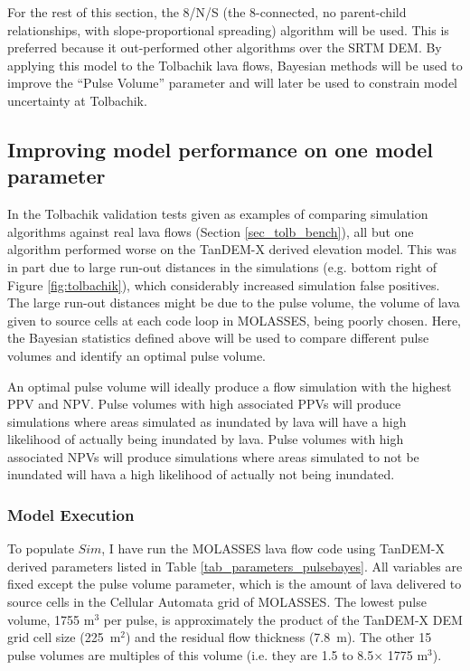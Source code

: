 	For the rest of this section, the 8/N/S (the 8-connected, no parent-child relationships, with slope-proportional spreading) algorithm will be used. This is preferred because it out-performed other algorithms over the SRTM DEM. By applying this model to the Tolbachik lava flows, Bayesian methods will be used to improve the ``Pulse Volume'' parameter and will later be used to constrain model uncertainty at Tolbachik.
	
	\subsection{Improving model performance on one model parameter}\label{sec_bayespulse}
	In the Tolbachik validation tests given as examples of comparing simulation algorithms against real lava flows (Section \ref {sec_tolb_bench}), all but one algorithm performed worse on the TanDEM-X derived elevation model. This was in part due to large run-out distances in the simulations (e.g. bottom right of Figure \ref{fig:tolbachik}), which considerably increased simulation false positives. The large run-out distances might be due to the pulse volume, the volume of lava given to source cells at each code loop in MOLASSES, being poorly chosen. Here, the Bayesian statistics defined above will be used to compare different pulse volumes and identify an optimal pulse volume. 
		
		An optimal pulse volume will ideally produce a flow simulation with the highest PPV and NPV. Pulse volumes with high associated PPVs will produce simulations where areas simulated as inundated by lava will have a high likelihood of actually being inundated by lava. Pulse volumes with high associated NPVs will produce simulations where areas simulated to not be inundated will hava a high likelihood of actually not being inundated.
		
		\subsubsection{Model Execution} 
		To populate $Sim$, I have run the MOLASSES lava flow code using TanDEM-X derived parameters listed in Table \ref{tab_parameters_pulsebayes}. All variables are fixed except the pulse volume parameter, which is the amount of lava delivered to source cells in the Cellular Automata grid of MOLASSES. The lowest pulse volume, 1755 m$^3$ per pulse, is approximately the product of the TanDEM-X DEM grid cell size (225~m$^2$) and the residual flow thickness (7.8~m). The other 15 pulse volumes are multiples of this volume (i.e. they are 1.5 to 8.5$\times$ 1775 m$^3$).
		
